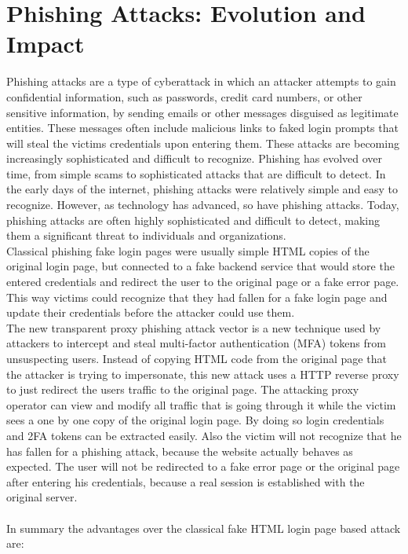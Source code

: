 \documentclass[12pt]{scrbook}
\begin{document}
\section{Phishing Attacks: Evolution and Impact}
Phishing attacks are a type
of cyberattack in which an attacker attempts to gain confidential information,
such as passwords, credit card numbers, or other sensitive information, by
sending emails or other messages disguised as legitimate entities. These
messages often include malicious links to faked login prompts that will steal
the victims credentials upon entering them. These attacks are becoming
increasingly sophisticated and difficult to recognize. Phishing has evolved
over time, from simple scams to sophisticated attacks that are difficult to
detect. In the early days of the internet, phishing attacks were relatively
simple and easy to recognize. However, as technology has advanced, so have
phishing attacks. Today, phishing attacks are often highly sophisticated and
difficult to detect, making them a significant threat to individuals and
organizations.\\Classical phishing fake login pages were usually simple
HTML copies of the original login page, but connected to a fake backend
service that would store the entered credentials and redirect the user to the
original page or a fake error page. This way victims could recognize that they
had fallen for a fake login page and update their credentials before the
attacker could use them.\\The new transparent proxy phishing attack vector
is a new technique used by attackers to intercept and steal multi-factor
authentication (MFA) tokens from unsuspecting users. Instead of copying HTML
code from the original page that the attacker is trying to impersonate, this
new attack uses a HTTP reverse proxy to just redirect the users traffic to the
original page. The attacking proxy operator can view and modify all traffic
that is going through it while the victim sees a one by one copy of the
original login page. By doing so login credentials and 2FA tokens can be
extracted easily. Also the victim will not recognize that he has fallen for a
phishing attack, because the website actually behaves as expected. The user
will not be redirected to a fake error page or the original page after
entering his credentials, because a real session is established with the
original server.\\ \\ In summary the advantages over the classical fake HTML
login page based attack are:
\end{document}
